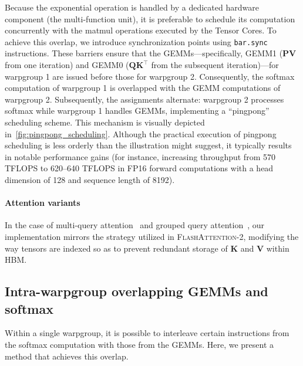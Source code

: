 Because the exponential operation is handled by a dedicated hardware component (the multi-function unit), it is preferable to schedule its computation concurrently with the matmul operations executed by the Tensor Cores. To achieve this overlap, we introduce synchronization points using \texttt{bar.sync} instructions. These barriers ensure that the GEMMs---specifically, GEMM1 ($\mathbf{P} \mathbf{V}$ from one iteration) and GEMM0 ($\mathbf{Q} \mathbf{K}^\top$ from the subsequent iteration)---for warpgroup 1 are issued before those for warpgroup 2. Consequently, the softmax computation of warpgroup 1 is overlapped with the GEMM computations of warpgroup 2. Subsequently, the assignments alternate: warpgroup 2 processes softmax while warpgroup 1 handles GEMMs, implementing a ``pingpong'' scheduling scheme. This mechanism is visually depicted in~\cref{fig:pingpong_scheduling}. Although the practical execution of pingpong scheduling is less orderly than the illustration might suggest, it typically results in notable performance gains (for instance, increasing throughput from 570 TFLOPS to 620--640 TFLOPS in FP16 forward computations with a head dimension of 128 and sequence length of 8192).

\paragraph{Attention variants} In the case of multi-query attention~\citep{shazeer2019fast} and grouped query attention~\citep{ainslie2023gqa}, our implementation mirrors the strategy utilized in \textsc{FlashAttention-2}, modifying the way tensors are indexed so as to prevent redundant storage of $\mathbf{K}$ and $\mathbf{V}$ within HBM.

\subsection{Intra-warpgroup overlapping GEMMs and softmax}

Within a single warpgroup, it is possible to interleave certain instructions from the softmax computation with those from the GEMMs. Here, we present a method that achieves this overlap.

